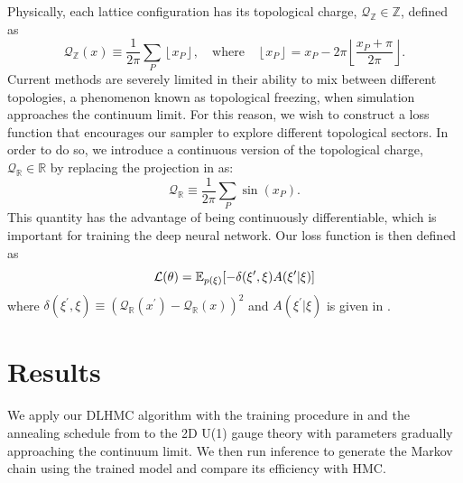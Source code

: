 \documentclass{article} %
\begin{document}
Physically, each lattice configuration has its topological charge, \(\mathcal{Q}_{\mathbb{Z}}\in\mathbb{Z}\), defined as
%
\begin{equation}
      \mathcal{Q}_{\mathbb{Z}}(x) \equiv \frac{1}{2\pi}\sum_{P}\left\lfloor x_{P}\right\rfloor,
   \quad\text{where}\quad \left\lfloor x_{P}\right\rfloor = x_{P} -
   2\pi\left\lfloor\frac{x_{P}+\pi}{2\pi}\right\rfloor.
   \label{eq:intcharge}
\end{equation}
%
Current methods are severely limited in their ability to mix between different topologies, a phenomenon known as topological freezing,
when simulation approaches the continuum limit.
%
For this reason, we wish to construct a loss function that encourages our sampler to explore different topological sectors.
%
In order to do so, we introduce a continuous version of the topological charge, \(\mathcal{Q}_{\mathbb{R}}\in\mathbb{R}\) by replacing the projection in  as:
%
\begin{equation}
    \mathcal{Q}_{\mathbb{R}} \equiv \frac{1}{2\pi}\sum_{P}\sin(x_{P}).
    \label{eq:sincharge}
\end{equation}
This quantity has the advantage of being continuously differentiable, which is important for training the deep neural network.
%
Our loss function is then defined as
%
\begin{equation}
   \mathcal{L}(\theta) = \mathbb{E}_{p(\xi)}{%
      \left[-\delta(\xi^{\prime}, \xi) A(\xi^{\prime}|\xi)\right]
   }
\end{equation}
%
where \(\delta(\xi^{\prime}, \xi) \equiv {\left(\mathcal{Q}_{\mathbb{R}}(x^{\prime}) - \mathcal{Q}_{\mathbb{R}}(x)\right)}^{2}\) and \(A(\xi^{\prime}|\xi)\) is given in .
%
%

\section{\label{sec:results}Results}
%
We apply our DLHMC algorithm with
the training procedure in  and the annealing schedule from 
to the 2D U(1) gauge theory with parameters gradually approaching the continuum limit.
We then run inference to generate the Markov chain using the trained model and compare its efficiency with HMC.
%
\end{document}
